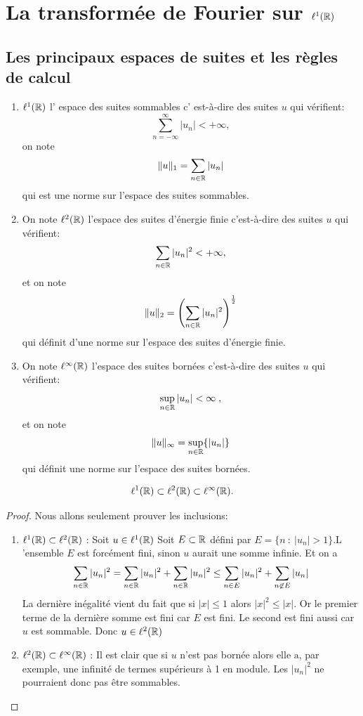 \section{La transform\'ee de Fourier sur $\ell^1(\mathbb{R})$}
\subsection{Les principaux espaces de suites et les r\`{e}gles de calcul}
\begin{definition}
\begin{enumerate}[label=(\roman*)]
\item  $\ell^1(\mathbb{R})$ l' espace des suites sommables  c' est-\`{a}-dire des suites $u$ qui v\'{e}rifient:
$$
\sum_{n=-\infty}^\infty |u_{n}|<+\infty,
$$
on note
$$
\Vert u\Vert_{1}=\sum_{n\in \mathbb{R}}|u_{n}|
$$
qui est une norme sur l'espace des suites sommables.
\item On note $\ell^2(\mathbb{R})$ l'espace des suites d'\'{e}nergie finie c'est-\`{a}-dire des suites $u$ qui v\'{e}rifient:
$$
\sum_{n\in \mathbb{R}}|u_{n}|^{2}<+\infty,
$$
et on note
$$
\Vert u\Vert_{2}=\left(\sum_{n\in \mathbb{R}}|u_{n}|^{2}\right)^{\frac{1}{2}}
$$
qui d\'efinit d'une norme sur l'espace des suites d'\'{e}nergie finie.
\item On note $\ell^\infty(\mathbb{R})$ l'espace des suites born\'{e}es c'est-\`{a}-dire des suites $u$ qui v\'{e}rifient:
$$
\sup_{n \in \mathbb{R}} |u_{n}| < \infty \;,
$$
et on note
$$
\Vert u\Vert_{\infty}=\sup_{n\in \mathbb{R}}\{|u_{n}|\}
$$
qui d\'efinit une norme sur l'espace des suites born\'{e}es.
\end{enumerate}
\end{definition}
\begin{lemma}
$$
\ell^1(\mathbb{R}) \subset \ell^2(\mathbb{R}) \subset \ell^\infty(\mathbb{R}) .
$$
\end{lemma}
\begin{proof}
Nous allons seulement prouver les inclusions:
\begin{enumerate}
\item $\ell^1(\mathbb{R}) \subset \ell^2(\mathbb{R})$ : Soit $u\in \ell^1(\mathbb{R})$ Soit $E\subset \mathbb{R}$ d\'{e}fini par $E=\{n\ :\ |u_{n}|>1\}. \mathrm{L}$'ensemble $E$ est forc\'{e}ment fini, sinon $u$ aurait une somme infinie. Et on a
$$
\sum_{n \in \mathbb{R}} |u_{n}|^{2}=\sum_{n \in \mathbb{R}} |u_{n}|^{2}+\sum_{n \in \mathbb{R}} |u_{n}|^{2}\leq\sum_{n \in E} |u_{n}|^{2}+\sum_{n \not \in E}|u_{n}|
$$
La derni\`{e}re in\'{e}galit\'{e} vient du fait que si $|x|\leq 1$ alors $|x|^{2}\leq|x|$. Or le premier terme de la derni\`{e}re somme est fini car $E$ est fini. Le second est fini aussi car $u$ est sommable. Donc $u\in \ell^2(\mathbb{R})$
\item $\ell^2(\mathbb{R})\subset \ell^\infty(\mathbb{R})$ : Il est clair que si $u$ n'est pas born\'{e}e alors elle $\mathrm{a}$, par exemple, une infinit\'{e} de termes sup\'{e}rieurs \`{a} 1 en module. Les $|u_{n}|^{2}$ ne pourraient donc pas \^{e}tre sommables.
\end{enumerate}
\end{proof}
